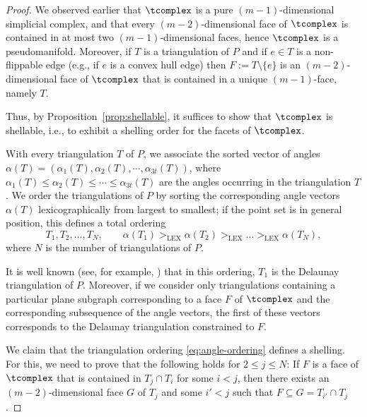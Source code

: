 \begin{proof}
We observed earlier that $\tcomplex$ is a pure $(m-1)$-dimensional simplicial complex,
and that every $(m-2)$-dimensional face of $\tcomplex$ is contained in at most two $(m-1)$-dimensional faces, hence $\tcomplex$ is a pseudomanifold. Moreover, if $T$ is a triangulation of $P$ and if $e\in T$ is a non-flippable edge
(e.g., if $e$ is a convex hull edge) then $F:=T\setminus\{e\}$ is an $(m-2)$-dimensional face of $\tcomplex$ that is contained in a unique $(m-1)$-face, namely $T$.%

Thus, by Proposition~\ref{prop:shellable}, it suffices to show that $\tcomplex$ is shellable, i.e., to exhibit a shelling order for the facets of $\tcomplex$. 

With every triangulation $T$ of $P$, we associate the sorted vector of angles $\alpha(T)=(\alpha_{1}(T),\alpha_{2}(T),\cdots,\alpha_{3t}(T))$, where $\alpha_{1}(T) \leq \alpha_{2}(T) \leq \cdots \leq\alpha_{3t}(T)$ are the angles occurring in the triangulation $T$. We order the triangulations of $P$ 
by sorting the corresponding angle vectors $\alpha(T)$ lexicographically from largest to smallest; if the point set is in general position, this defines a total ordering
\begin{equation}
\label{eq:angle-ordering}
T_1,T_2,\dots,T_N,\qquad \alpha(T_1)>_{\textrm{LEX}}\alpha(T_2)>_{\textrm{LEX}}\dots>_{\textrm{LEX}}\alpha(T_N),
\end{equation}
where $N$ is the number of triangulations of $P$.

It is well known (see, for example, \cite[Chap.~3.4]{devadoss2011discrete})
that in this ordering, $T_{1}$ is the Delaunay triangulation of
$P$. Moreover, if we consider only triangulations containing a particular
plane subgraph corresponding to a face $F$ of $\tcomplex$ 
and the corresponding subsequence of the angle vectors,
the first of these vectors corresponds to the Delaunay triangulation
constrained to $F$. 

We claim that the triangulation ordering \eqref{eq:angle-ordering} defines a
shelling.  For this, we need to prove that the following holds for $2\leq j\leq N$:
If $F$ is a face of $\tcomplex$ that is contained in $T_j\cap T_i$ for some $i<j$,
then there exists an $(m-2)$-dimensional face $G$ of $T_j$ and some $i'<j$
such that $F\subseteq G=T_{i'}\cap T_j$.


\end{proof}
